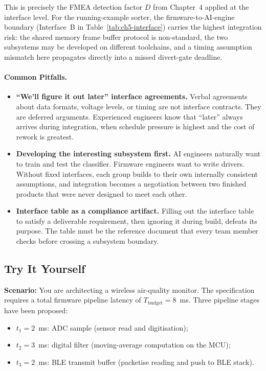 This is precisely the FMEA detection factor $D$ from Chapter~4 applied at the interface level.
For the running-example sorter, the firmware-to-AI-engine boundary (Interface~B in Table~\ref{tab:ch5-interface}) carries the highest integration risk: the shared memory frame buffer protocol is non-standard, the two subsystems may be developed on different toolchains, and a timing assumption mismatch here propagates directly into a missed divert-gate deadline.

\paragraph{Common Pitfalls.}
\begin{itemize}
  \item \textbf{``We'll figure it out later'' interface agreements.}
        Verbal agreements about data formats, voltage levels, or timing are not interface contracts.
        They are deferred arguments.
        Experienced engineers know that ``later'' always arrives during integration, when schedule pressure is highest and the cost of rework is greatest.
  \item \textbf{Developing the interesting subsystem first.}
        AI engineers naturally want to train and test the classifier.
        Firmware engineers want to write drivers.
        Without fixed interfaces, each group builds to their own internally consistent assumptions, and integration becomes a negotiation between two finished products that were never designed to meet each other.
  \item \textbf{Interface table as a compliance artifact.}
        Filling out the interface table to satisfy a deliverable requirement, then ignoring it during build, defeats its purpose.
        The table must be the reference document that every team member checks before crossing a subsystem boundary.
\end{itemize}

\subsection*{Try It Yourself}
\label{sec:ch5-tiy}

\textbf{Scenario:} You are architecting a wireless air-quality monitor.
The specification requires a total firmware pipeline latency of $T_{\text{budget}} = 8$~ms.
Three pipeline stages have been proposed:
\begin{itemize}
  \item $t_1 = 2$~ms: ADC sample (sensor read and digitisation);
  \item $t_2 = 3$~ms: digital filter (moving-average computation on the MCU);
  \item $t_3 = 2$~ms: BLE transmit buffer (packetise reading and push to BLE stack).
\end{itemize}

